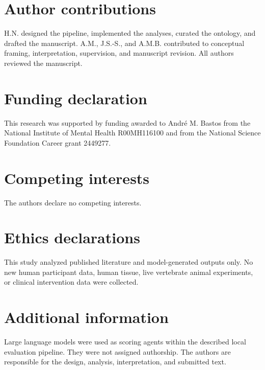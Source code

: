 \documentclass[12pt]{article}
\begin{document}
\section*{Author contributions}\label{author-contributions}
H.N. designed the pipeline, implemented the analyses, curated the ontology, and drafted the manuscript. A.M., J.S.-S., and A.M.B. contributed to conceptual framing, interpretation, supervision, and manuscript revision. All authors reviewed the manuscript.

\section*{Funding declaration}\label{}
This research was supported by funding awarded to André M. Bastos from the National Institute of Mental Health R00MH116100 and from the National Science Foundation Career grant 2449277.

\section*{Competing interests}\label{competing-interests}
The authors declare no competing interests.

\section*{Ethics declarations}\label{ethics-declarations}
This study analyzed published literature and model-generated outputs only. No new human participant data, human tissue, live vertebrate animal experiments, or clinical intervention data were collected.

\section*{Additional information}\label{additional-information}
Large language models were used as scoring agents within the described local evaluation pipeline. They were not assigned authorship. The authors are responsible for the design, analysis, interpretation, and submitted text.
\end{document}

